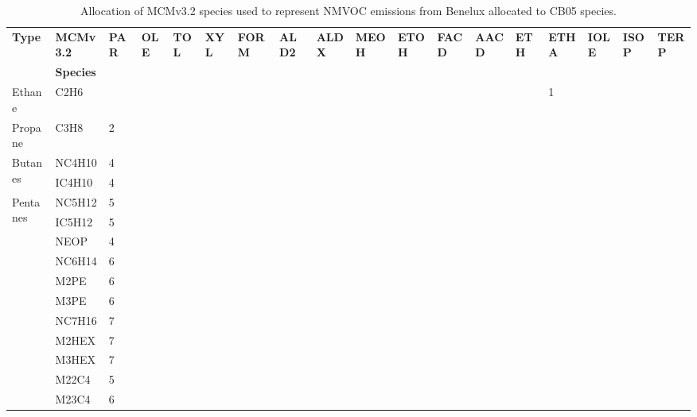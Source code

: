 \scriptsize
\begin{longtable}{llllllllllllllllll}
	\caption{Allocation of MCMv3.2 species used to represent NMVOC emissions from Benelux allocated to CB05 species.}\\
	\hline \hline
	\multirow{2}{*}{\textbf{Type}} & \textbf{MCMv3.2} & \multirow{2}{*}{\textbf{PAR}} & \multirow{2}{*}{\textbf{OLE}} & \multirow{2}{*}{\textbf{TOL}} & \multirow{2}{*}{\textbf{XYL}} & \multirow{2}{*}{\textbf{FORM}} & \multirow{2}{*}{\textbf{ALD2}} & \multirow{2}{*}{\textbf{ALDX}} & \multirow{2}{*}{\textbf{MEOH}} & \multirow{2}{*}{\textbf{ETOH}} & \multirow{2}{*}{\textbf{FACD}} & \multirow{2}{*}{\textbf{AACD}} & \multirow{2}{*}{\textbf{ETH}} & \multirow{2}{*}{\textbf{ETHA}} & \multirow{2}{*}{\textbf{IOLE}} & \multirow{2}{*}{\textbf{ISOP}} & \multirow{2}{*}{\textbf{TERP}} \\
& \textbf{Species} & & & & & & & & & & & & & & & & \\
	\endhead
	\hline
	Ethane & C2H6 &  &  &  &  &  &  &  &  &  &  &  &  & 1 &  &  & \\
	\hline Propane & C3H8 & 2 &  &  &  &  &  &  &  &  &  &  &  &  &  &  & \\ \hline
	\multirow{2}{*}{Butanes} & NC4H10 & 4 &  &  &  &  &  &  &  &  &  &  &  &  &  &  & \\
	 & IC4H10 & 4 &  &  &  &  &  &  &  &  &  &  &  &  &  &  & \\
	\hline \multirow{3}{*}{Pentanes} & NC5H12 & 5 &  &  &  &  &  &  &  &  &  &  &  &  &  &  & \\
	 & IC5H12 & 5 &  &  &  &  &  &  &  &  &  &  &  &  &  &  & \\
	 & NEOP & 4 &  &  &  &  &  &  &  &  &  &  &  &  &  &  & \\
	\hline \parbox[t]{2mm}{} & NC6H14 & 6 &  &  &  &  &  &  &  &  &  &  &  &  &  &  & \\
	 & M2PE & 6 &  &  &  &  &  &  &  &  &  &  &  &  &  &  & \\
	 & M3PE & 6 &  &  &  &  &  &  &  &  &  &  &  &  &  &  & \\
	 & NC7H16 & 7 &  &  &  &  &  &  &  &  &  &  &  &  &  &  & \\
	 & M2HEX & 7 &  &  &  &  &  &  &  &  &  &  &  &  &  &  & \\
	 & M3HEX & 7 &  &  &  &  &  &  &  &  &  &  &  &  &  &  & \\
	 & M22C4 & 5 &  &  &  &  &  &  &  &  &  &  &  &  &  &  & \\
	 & M23C4 & 6 &  &  &  &  &  &  &  &  &  &  &  &  &  &  & \\

\end{longtable}
